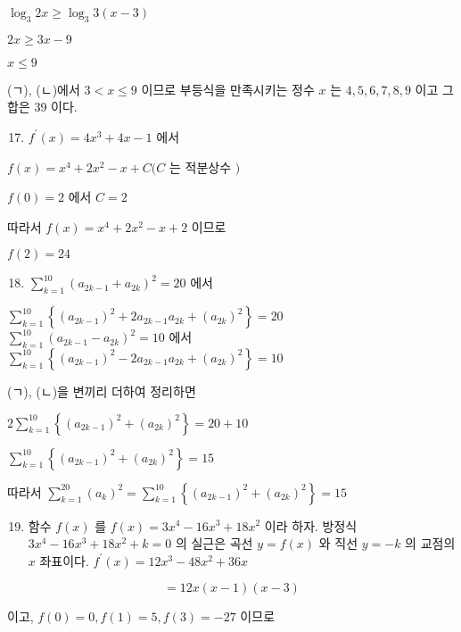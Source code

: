 \documentclass[10pt]{article}
\begin{document}
$\log _{3} 2 x \geq \log _{3} 3(x-3)$

$2 x \geq 3 x-9$

$x \leq 9$

(ㄱ), (ㄴ)에서 $3<x \leq 9$ 이므로 부등식을 만족시키는 정수 $x$ 는 $4,5,6,7,8,9$ 이고 그 합은 39 이다.

\begin{enumerate}
  \setcounter{enumi}{16}
  \item $f^{\prime}(x)=4 x^{3}+4 x-1$ 에서
\end{enumerate}

$f(x)=x^{4}+2 x^{2}-x+C(C$ 는 적분상수 $)$

$f(0)=2$ 에서 $C=2$

따라서 $f(x)=x^{4}+2 x^{2}-x+2$ 이므로

$f(2)=24$

\begin{enumerate}
  \setcounter{enumi}{17}
  \item $\sum_{k=1}^{10}\left(a_{2 k-1}+a_{2 k}\right)^{2}=20$ 에서
\end{enumerate}

$\sum_{k=1}^{10}\left\{\left(a_{2 k-1}\right)^{2}+2 a_{2 k-1} a_{2 k}+\left(a_{2 k}\right)^{2}\right\}=20$\\
$\sum_{k=1}^{10}\left(a_{2 k-1}-a_{2 k}\right)^{2}=10$ 에서\\
$\sum_{k=1}^{10}\left\{\left(a_{2 k-1}\right)^{2}-2 a_{2 k-1} a_{2 k}+\left(a_{2 k}\right)^{2}\right\}=10$

(ㄱ), (ㄴ)을 변끼리 더하여 정리하면

$2 \sum_{k=1}^{10}\left\{\left(a_{2 k-1}\right)^{2}+\left(a_{2 k}\right)^{2}\right\}=20+10$

$\sum_{k=1}^{10}\left\{\left(a_{2 k-1}\right)^{2}+\left(a_{2 k}\right)^{2}\right\}=15$

따라서 $\sum_{k=1}^{20}\left(a_{k}\right)^{2}=\sum_{k=1}^{10}\left\{\left(a_{2 k-1}\right)^{2}+\left(a_{2 k}\right)^{2}\right\}=15$

\begin{enumerate}
  \setcounter{enumi}{18}
  \item 함수 $f(x)$ 를 $f(x)=3 x^{4}-16 x^{3}+18 x^{2}$ 이라 하자. 방정식 $3 x^{4}-16 x^{3}+18 x^{2}+k=0$ 의 실근은 곡선 $y=f(x)$ 와 직선 $y=-k$ 의 교점의 $x$ 좌표이다. $f^{\prime}(x)=12 x^{3}-48 x^{2}+36 x$
\end{enumerate}

\[
=12 x(x-1)(x-3)
\]

이고, $f(0)=0, f(1)=5, f(3)=-27$ 이므로
\end{document}
